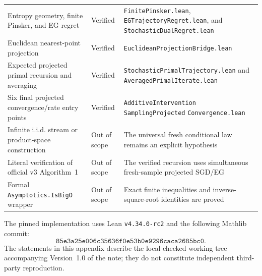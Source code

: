 \begin{center}
\begin{tabular}{>{\raggedright\arraybackslash}p{}
                >{\raggedright\arraybackslash}p{}
                >{\raggedright\arraybackslash}p{}}
Entropy geometry, finite Pinsker, and EG regret
& Verified
& \texttt{FinitePinsker.lean}, \texttt{EGTrajectoryRegret.lean}, and
  \texttt{StochasticDualRegret.lean} \\

Euclidean nearest-point projection
& Verified
& \texttt{EuclideanProjectionBridge.lean} \\

Expected projected primal recursion and averaging
& Verified
& \texttt{StochasticPrimalTrajectory.lean} and
  \texttt{AveragedPrimalIterate.lean} \\

Six final projected convergence/rate entry points
& Verified
& \texttt{AdditiveIntervention}\newline
  \texttt{SamplingProjected}\newline
  \texttt{Convergence.lean} \\

Infinite i.i.d. stream or product-space construction
& Out of scope
& The universal fresh conditional law remains an explicit hypothesis \\

Literal verification of official v3 Algorithm~1
& Out of scope
& The verified recursion uses simultaneous fresh-sample projected SGD/EG \\

Formal \texttt{Asymptotics.IsBigO} wrapper
& Out of scope
& Exact finite inequalities and inverse-square-root identities are proved \\
\bottomrule
\end{tabular}
\end{center}

The pinned implementation uses Lean \texttt{v4.34.0-rc2} and the following
Mathlib commit:
\[
  \texttt{85e3a25e006c35636f0e53b0e9296caca2685bc0}.
\]
The statements in this appendix describe the local checked working tree
accompanying Version~1.0 of the note; they do not constitute independent
third-party reproduction.
